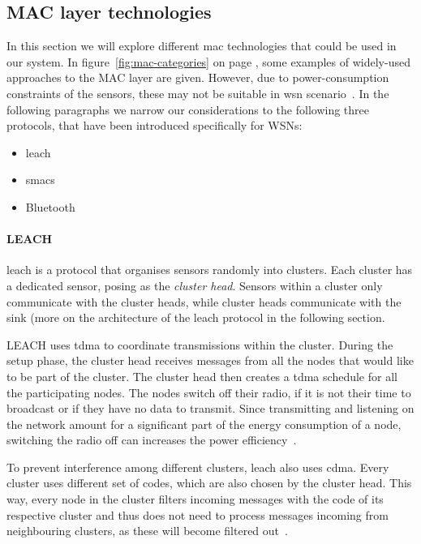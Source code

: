 \subsection{MAC layer technologies}

In this section we will explore different \acrshort{mac} technologies that could be used in our system. In figure~\ref{fig:mac-categories} on page \pageref{fig:mac-categories}, some examples of widely-used approaches to the MAC layer are given. However, due to power-consumption constraints of the sensors, these may not be suitable in \acrshort{wsn} scenario~\cite{Sohraby2007WirelessApplications}. In the following paragraphs we narrow our considerations to the following three protocols, that have been introduced specifically for WSNs:
\begin{itemize}[noitemsep]
    \item \acrfull{leach}
    \item \acrfull{smacs}
    \item Bluetooth
\end{itemize}

\paragraph{LEACH}
\acrshort{leach} is a protocol that organises sensors randomly into clusters. Each cluster has a dedicated sensor, posing as the \textit{cluster head}. Sensors within a cluster only communicate with the cluster heads, while cluster heads communicate with the sink (more on the architecture of the \acrshort{leach} protocol in the following section.

LEACH uses \acrfull{tdma} to coordinate transmissions within the cluster. During the setup phase, the cluster head receives messages from all the nodes that would like to be part of the cluster. The cluster head then creates a \acrshort{tdma} schedule for all the participating nodes. The nodes switch off their radio, if it is not their time to broadcast or if they have no data to transmit. Since transmitting and listening on the network amount for a significant part of the energy consumption of a node, switching the radio off can increases the power efficiency~\cite{Sohraby2007WirelessApplications, Heinzelman2000Energy-efficientNetworks}.

To prevent interference among different clusters, \acrshort{leach} also uses \acrfull{cdma}. Every cluster uses different set of codes, which are also chosen by the cluster head. This way, every node in the cluster filters incoming messages with the code of its respective cluster and thus does not need to process messages incoming from neighbouring clusters, as these will become filtered out~\cite{Heinzelman2000Energy-efficientNetworks}.

